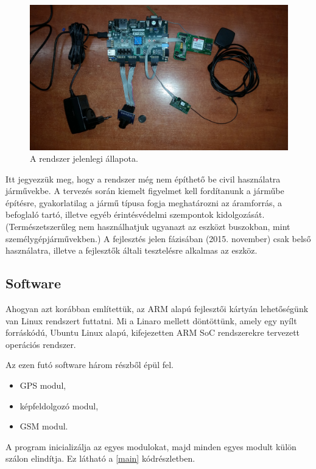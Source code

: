 \documentclass[a4paper,12pt]{report}
\begin{document}
\begin{figure}[h]
\centerline{
\includegraphics[width=6in]{img/currentsys}}
\caption{A rendszer jelenlegi állapota.}
\label{currentsys}
\end{figure}

Itt jegyezzük meg, hogy a rendszer még nem építhető be civil használatra járművekbe. A tervezés során kiemelt figyelmet kell fordítanunk a járműbe építésre, gyakorlatilag a jármű típusa fogja meghatározni az áramforrás, a befoglaló tartó, illetve egyéb érintésvédelmi szempontok kidolgozását. (Természetszerűleg nem használhatjuk ugyanazt az eszközt buszokban, mint személygépjárművekben.) A fejlesztés jelen fázisában (2015. november) csak belső használatra, illetve a fejlesztők általi tesztelésre alkalmas az eszköz.

\subsection{Software}
\label{rttasw}

Ahogyan azt korábban említettük, az ARM alapú fejlesztői kártyán lehetőségünk van Linux rendszert futtatni. Mi a Linaro mellett döntöttünk, amely egy nyílt forráskódú, Ubuntu Linux alapú, kifejezetten ARM SoC rendszerekre tervezett operációs rendszer. 

Az ezen futó software három részből épül fel.

\begin{itemize}
\item GPS modul,
\item képfeldolgozó modul,
\item GSM modul.
\end{itemize}

A program inicializálja az egyes modulokat, majd minden egyes modult külön szálon elindítja. Ez látható a \ref{main} kódrészletben.
\end{document}
